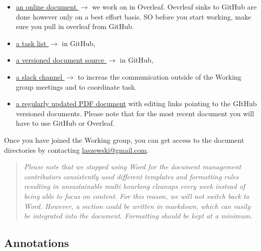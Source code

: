 \begin{itemize}

\item
  \href{https://www.overleaf.com/project/619ba513e4aade4400e06df8}{an
    online document $\rightarrow$} we work on in Overleaf. Oevrleaf
  sinks to GitHub are done however only on a best effort basis. SO
  before you start working, make sure you pull in overleaf from
  GitHub.

\item \href{https://github.com/orgs/cyberaide/projects/1}{a task list
  $\rightarrow$} in GitHub,

\item \href{https://github.com/orgs/cyberaide/}{a versioned document
  source $\rightarrow$} in GitHub,

\item \href{https://nist-analytics.slack.com}{a slack channel
  $\rightarrow$} to increas the communication outside of the Working
  group meetings and to coordinate task.

\item
  \href{https://github.com/cyberaide/NIST-analytics/raw/main/NIST-analytics.pdf}{a
    regularly updated PDF document} with editing links pointing to the
  GItHub versioned documents. Please note that for the most recent
  document you will have to use GitHub or Overleaf. 
  
\end{itemize}

Once you have joined the Working group, you can get access to the
document directories by contacting \href{mailto:laszewski@gmail.com}{laszewski@gmail.com}.

\begin{quote}

{\em Please note that we stopped using Word for the document
  management contributors consistently used different templates and
  formatting rules resulting in unsustainable multi hourlong cleanups
  every week instead of being able to focus on content. For this
  reason, we will not switch back to Word. However, a section could be
  written in markdown, which can easily be integrated into the
  document. Formatting should be kept at a minimum.}

\end{quote}


\subsection*{Annotations}

